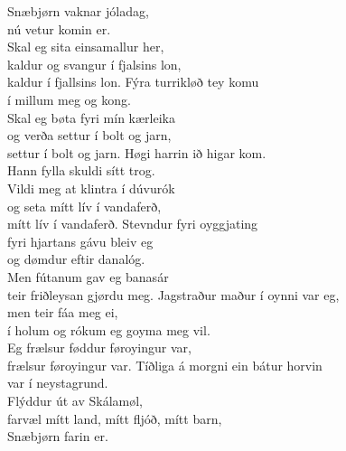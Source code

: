 \begin{flushleft}
Snæbjørn vaknar jóladag, \tab{}\\
nú vetur komin er.\tab{}\\
Skal eg sita einsamallur her,\tab{}\\
kaldur og svangur í fjalsins lon,\tab{}\\
kaldur í fjallsins lon.\tab{}
\hops
Fýra turrikløð tey komu\\
í millum meg og kong.\\
Skal eg bøta fyri mín kærleika\\
og verða settur í bolt og jarn,\\
settur í bolt og jarn.
\hops
Høgi harrin ið higar kom.\\
Hann fylla skuldi sítt trog.\\
Vildi meg at klintra í dúvurók\\
og seta mítt lív í vandaferð,\\
mítt lív í vandaferð.
\hops
Stevndur fyri oyggjating\\
fyri hjartans gávu bleiv eg\\
og dømdur eftir danalóg.\\
Men fútanum gav eg banasár\\
teir friðleysan gjørdu meg.
\hops
Jagstraður maður í oynni var eg,\\
men teir fáa meg ei,\\
í holum og rókum eg goyma meg vil.\\
Eg frælsur føddur føroyingur var,\\
frælsur føroyingur var.
\hops
Tíðliga á morgni ein bátur horvin\\
var í neystagrund.\\
Flýddur út av Skálamøl,\\
farvæl mítt land, mítt fljóð, mítt barn,\\
Snæbjørn farin er.
\end{flushleft}
\newpage

